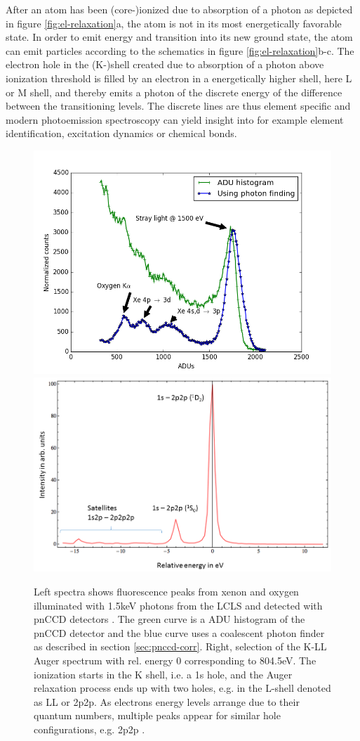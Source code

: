 After an atom has been (core-)ionized due to absorption of a photon as depicted in figure \ref{fig:el-relaxation}a, the atom is not in its most energetically favorable state. In order to emit energy and transition into its new ground state, the atom can emit particles according to the schematics in figure \ref{fig:el-relaxation}b-c. The electron hole in the (K-)shell created due to absorption of a photon above ionization threshold is filled by an electron in a energetically higher shell, here L or M shell, and thereby emits a photon of the discrete energy of the difference between the transitioning levels. The discrete lines are thus element specific and modern photoemission spectroscopy can yield insight into for example element identification, excitation dynamics or chemical bonds.
\begin{figure}
	\centering
		\includegraphics[width=.49\textwidth]{images/pnCCD-histogram.png}
		\includegraphics[width=.49\textwidth]{images/auger-spectra.png}
	\caption[Fluoresence spectra from xenon and Auger spectra from neon.]{Left spectra shows fluorescence peaks from xenon and oxygen illuminated with 1.5keV photons from the LCLS and detected with pnCCD detectors \citep{Bucher-2016-Unpublished, Rudek-2012-NatPho}. The green curve is a ADU histogram of the pnCCD detector and the blue curve uses a coalescent photon finder as described in section \ref{sec:pnccd-corr}. Right, selection of the K-LL Auger spectrum with rel. energy 0 corresponding to 804.5eV. The ionization starts in the K shell, i.e. a 1s hole, and the Auger relaxation process ends up with two holes, e.g. in the L-shell denoted as LL or 2p2p. As electrons energy levels arrange due to their quantum numbers, multiple peaks appear for similar hole configurations, e.g. 2p2p \cite{Bucher-2014-Unpublished,Krause-1970-PhysLettA}.}
	\label{fig:pnCCD-histogram}
\end{figure}

